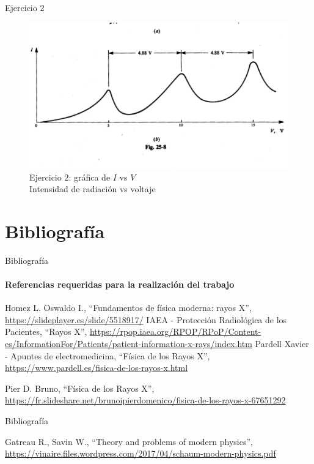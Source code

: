 \documentclass{beamer}
\begin{document}
\begin{darkframes}
\begin{frame}{Ejercicio 2}
        \begin{figure}
            \centering
            \includegraphics[width = 0.7 \linewidth]{resources/31f.png}
            \caption{Ejercicio 2: gr\'afica de $I$ vs $V$\\Intensidad de radiaci\'on vs voltaje}
            \label{fig:my_label}
        \end{figure}
        
    \end{frame}

    \section{Bibliograf\'ia} %
    \begin{frame}{Bibliograf\'ia} %
      \framesubtitle{Referencias requeridas para la realizaci\'on del trabajo} %
      \begin{thebibliography}{9}
            Homez L. Oswaldo I., “Fundamentos de f\'isica moderna: rayos X”, \url{https://slideplayer.es/slide/5518917/}
            IAEA - Protecci\'on Radiol\'ogica de los Pacientes, “Rayos X”, \url{https://rpop.iaea.org/RPOP/RPoP/Content-es/InformationFor/Patients/patient-information-x-rays/index.htm}
           Pardell Xavier - Apuntes de electromedicina, “F\'isica de los Rayos X”, \url{https://www.pardell.es/fisica-de-los-rayos-x.html}

            Pier D. Bruno, “F\'isica de los Rayos X”, \url{https://fr.slideshare.net/brunoipierdomenico/fisica-de-los-rayos-x-67651292}
      \end{thebibliography}
    \end{frame}
    
    \begin{frame}{Bibliograf\'ia} %
      \begin{thebibliography}{9}
            Gatreau R., Savin W., “Theory and problems of modern physics”, \url{https://vinaire.files.wordpress.com/2017/04/schaum-modern-physics.pdf}
       
      \end{thebibliography}
    \end{frame}

  \end{darkframes}
\end{document}
